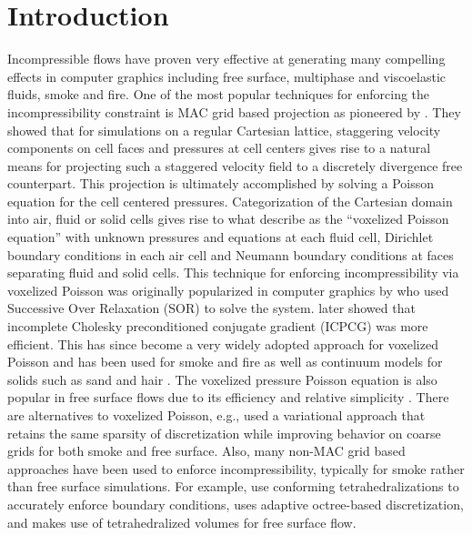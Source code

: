 \section{Introduction}
Incompressible flows have proven very effective at generating many compelling effects in computer graphics including free surface, multiphase and viscoelastic fluids, smoke and fire. One
of the most popular techniques for enforcing the incompressibility constraint is MAC grid based projection as pioneered by \cite{HW65}. They showed that for simulations on a regular
Cartesian lattice, staggering velocity components on cell faces and pressures at cell centers gives rise to a natural means for projecting such a staggered velocity field to a discretely
divergence free counterpart. This projection is ultimately accomplished by solving a Poisson equation for the cell centered pressures. Categorization of the Cartesian domain into air,
fluid or solid cells gives rise to what \cite{BBB07} describe as the ``voxelized Poisson equation'' with unknown pressures and equations at each fluid cell, Dirichlet boundary conditions
in each air cell and Neumann boundary conditions at faces separating fluid and solid cells. This technique for enforcing incompressibility via voxelized Poisson was originally
popularized in computer graphics by \cite{FM96} who used Successive Over Relaxation (SOR) to solve the system. \cite{FF01} later showed that incomplete Cholesky preconditioned conjugate
gradient (ICPCG) was more efficient. This has since become a very widely adopted approach for voxelized Poisson and has been used for smoke \cite{SRF05,MTPS04,FSJ01} and fire \cite{HG09} as well as continuum models for solids such as sand \cite{ZB05} and hair \cite{MSWST09}. The voxelized pressure Poisson equation is also popular in free surface flows due to its efficiency and relative simplicity
\cite{CMT04,FF01,GBO04,HK05,HLYK08,KC07,MTPS04,NNSM08,WMT05,ZB05}. There are alternatives to voxelized Poisson, e.g., \cite{BBB07} used a variational approach that retains the same sparsity of discretization while improving behavior on coarse grids for both smoke and free surface. Also, many non-MAC grid based approaches have been used to enforce incompressibility, typically for smoke rather than free surface simulations. For example, \cite{MCPTD09,KFCO06,FOK05,ETKSD07} use conforming tetrahedralizations to accurately enforce boundary conditions, \cite{LGF04} uses adaptive octree-based discretization, and \cite{CNF07} makes use of tetrahedralized volumes for free surface flow.

